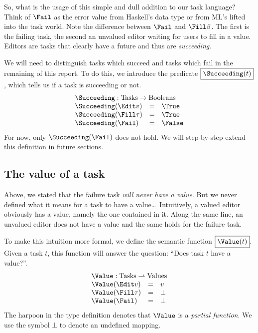 So, what is the usage of this simple and dull addition to our task language?
Think of $\Fail$ as the error value  from Haskell's  data type
or  from ML's  lifted into the task world.
Note the difference between $\Fail$ and $\Fill\beta$.
The first is the failing task,
the second an unvalued editor waiting for users to fill in a value.
Editors are tasks that clearly have a future and thus are \emph{succeeding}.

We will need to distinguish tasks which succeed and tasks which fail in the remaining of this report.
To do this,
we introduce the predicate $\boxed{\Succeeding(t)}$,
which tells us if a task is succeeding or not.
\begin{equation*}
  \begin{array}{lcl}
    \multicolumn{3}{l}{\Succeeding : \mathrm{Tasks} \to \mathrm{Booleans}} \\
    \Succeeding(\Edit v)    &=& \True \\
    \Succeeding(\Fill \tau) &=& \True \\
    \Succeeding(\Fail)      &=& \False
  \end{array}
\end{equation*}
For now,
only $\Succeeding(\Fail)$ does not hold.
We will step-by-step extend this definition in future sections.


\subsection{The value of a task}
\label{sec:value}

Above, we stated that the failure task \emph{will never have a value}.
But we never defined what it means for a task to have a value\ldots\
Intuitively,
a valued editor obviously has a value,
namely the one contained in it.
Along the same line,
an unvalued editor does not have a value
and the same holds for the failure task.

To make this intuition more formal,
we define the semantic function $\boxed{\Value(t)}$.
Given a task $t$, this function will answer the question:
\enquote{Does task $t$ have a value?}.
\begin{equation*}
  \begin{array}{lcl}
    \multicolumn{3}{l}{\Value : \mathrm{Tasks} \rightharpoonup \mathrm{Values}} \\
    \Value(\Edit v)    &=& v \\
    \Value(\Fill \tau) &=& \bot \\
    \Value(\Fail)      &=& \bot
  \end{array}
\end{equation*}
The harpoon in the type definition denotes that $\Value$ is a \emph{partial function}.
We use the symbol $\bot$ to denote an undefined mapping.
